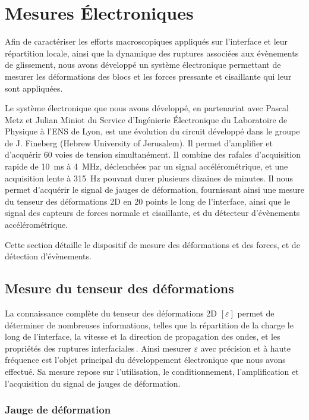 \section{Mesures Électroniques}
\label{sec:electronique}

Afin de caractériser les efforts macroscopiques appliqués sur l'interface et leur répartition locale, ainsi que la dynamique des ruptures associées aux évènements de glissement, nous avons développé un système électronique permettant de mesurer les déformations des blocs et les forces pressante et cisaillante qui leur sont appliquées.

Le système électronique que nous avons développé, en partenariat avec Pascal Metz et Julian Miniot du Service d'Ingénierie Électronique du Laboratoire de Physique à l'ENS de Lyon, est une évolution du circuit développé dans le groupe de J. Fineberg (Hebrew University of Jerusalem).
Il permet d'amplifier et d'acquérir 60 voies de tension simultanément. Il combine des rafales d'acquisition rapide de \SI{10}{\milli\second} à \SI{4}{\mega\hertz}, déclenchées par un signal accélérométrique, et une acquisition lente à \SI{315}{\hertz} pouvant durer plusieurs dizaines de minutes. Il nous permet d'acquérir le signal de jauges de déformation, fournissant ainsi une mesure du tenseur des déformations 2D en 20 points le long de l'interface, ainsi que le signal des capteurs de forces normale et cisaillante, et du détecteur d'évènements accélérométrique.

Cette section détaille le dispositif de mesure des déformations et des forces, et de détection d'évènements.


\subsection{Mesure du tenseur des déformations}

La connaissance complète du tenseur des déformations 2D $[\varepsilon]$ permet de déterminer de nombreuses informations, telles que la répartition de la charge le long de l'interface, la vitesse et la direction de propagation des ondes, et les propriétés des ruptures interfaciales\,\cite{svetlizky_brittle_2017}. Ainsi mesurer $\varepsilon$ avec précision et à haute fréquence est l'objet principal du développement électronique que nous avons effectué. Sa mesure repose sur l'utilisation, le conditionnement, l'amplification et l'acquisition du signal de jauges de déformation.

\subsubsection{Jauge de déformation}
\label{sec:gages}

